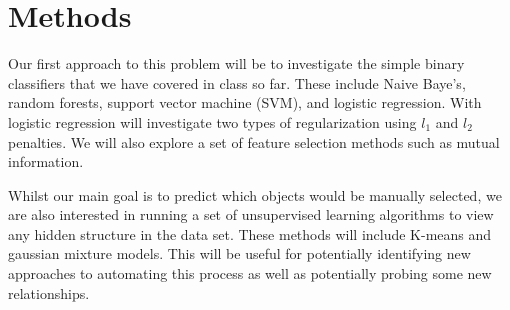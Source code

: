 \section{Methods}

Our first approach to this problem will be to investigate the simple binary classifiers that we have covered in class so far. These include Naive Baye's, random forests, support vector machine (SVM), and logistic regression. With logistic regression will investigate two types of regularization using $l_1$ and $l_2$ penalties. We will also explore a set of feature selection methods such as mutual information.

Whilst our main goal is to predict which objects would be manually selected, we are also interested in running a set of unsupervised learning algorithms to view any hidden structure in the data set. These methods will include K-means and gaussian mixture models. This will be useful for potentially identifying new approaches to automating this process as well as potentially probing some new relationships.